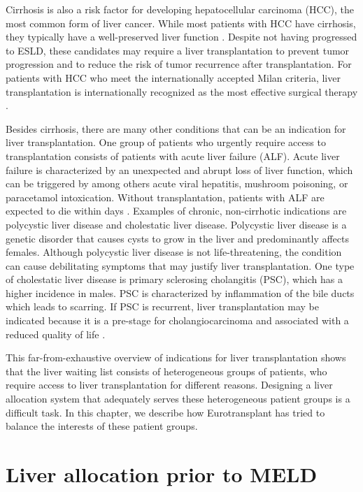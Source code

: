 \documentclass[11pt,twoside,]{book}
\begin{document}
Cirrhosis is also a risk factor for developing hepatocellular carcinoma (HCC),
the most common form of liver cancer. While most patients with HCC have cirrhosis,
they typically have a well-preserved liver function \citep{olearyIndicationsLiverTransplantation2008}.
Despite not having progressed to ESLD, these candidates may require a
liver transplantation to prevent tumor progression and to reduce the risk of
tumor recurrence after transplantation. For patients with HCC who meet the internationally
accepted Milan criteria, liver transplantation is internationally recognized as
the most effective surgical therapy \citep{Galle2018}.

Besides cirrhosis, there are many other conditions that can be an indication
for liver transplantation. One group of patients who urgently require access
to transplantation consists of patients with acute liver failure (ALF).
Acute liver failure is characterized
by an unexpected and abrupt loss of liver function, which can be triggered by
among others acute viral hepatitis, mushroom poisoning, or paracetamol intoxication. Without
transplantation, patients with ALF are expected to die within days \citep{stravitzAcuteLiverFailure2019}.
Examples of chronic, non-cirrhotic indications are polycystic liver disease and cholestatic
liver disease. Polycystic liver disease is a genetic
disorder that causes cysts to grow in the liver and predominantly affects females.
Although polycystic liver disease is not life-threatening, the condition can
cause debilitating symptoms that may justify liver transplantation.
One type of cholestatic liver disease is primary sclerosing cholangitis (PSC),
which has a higher incidence in males. PSC is characterized by inflammation of the bile ducts
which leads to scarring. If PSC is recurrent, liver transplantation may be indicated
because it is a pre-stage for cholangiocarcinoma and associated with a
reduced quality of life \citep{olearyIndicationsLiverTransplantation2008}.

This far-from-exhaustive overview of indications for liver transplantation
shows that the liver waiting list consists of heterogeneous groups of patients, who require access to liver transplantation for different reasons. Designing a
liver allocation system that adequately serves these heterogeneous patient
groups is a difficult task. In this chapter, we describe how Eurotransplant
has tried to balance the interests of these patient groups.

\section{Liver allocation prior to MELD}\label{liver-allocation-prior-to-meld}
\end{document}
